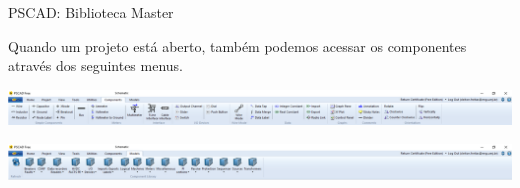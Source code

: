 \begin{frame}{PSCAD: Biblioteca Master}
\centering

Quando um projeto está aberto, também podemos acessar os componentes através dos seguintes menus.

\vspace*{1cm}

\includegraphics[width=0.85\linewidth]{./figuras/Primeiros-Passos/biblioteca_barra_components}
\vspace*{1cm}

\includegraphics[width=0.85\linewidth]{./figuras/Primeiros-Passos/biblioteca_barra_models}

\end{frame}





